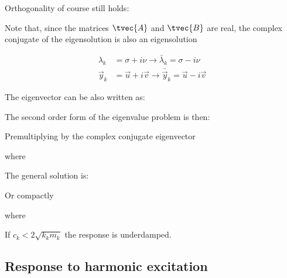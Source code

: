 \documentclass[10pt,a4paper]{scrartcl}
\begin{document}
\begin{multicols*}{2}

Orthogonality of course still holds:


Note that, since the matrices $\tvec{A}$ and $\tvec{B}$ are real, the complex conjugate of the eigensolution is also an eigensolution

\begin{align*}
\lambda_k&=\sigma+i\nu\rightarrow\bar{\lambda}_k=\sigma-i\nu\\
\vec{y}_k&=\vec{u}+i\vec{v}\rightarrow\bar{\vec{y}}_k=\vec{u}-i\vec{v}
\end{align*}

The eigenvector can be also written as:


The second order form of the eigenvalue problem is then:


Premultiplying by the complex conjugate eigenvector


where


The general solution is:


Or compactly


where


If $c_k<2\sqrt{k_km_k}$ the response is underdamped.

\subsection{Response to harmonic excitation}


\end{multicols*}
\end{document}
